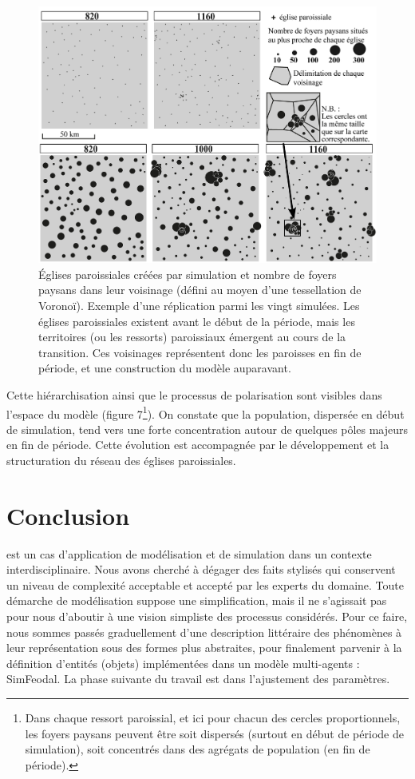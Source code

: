 \begin{figure}[!h]
	\centering
	\includegraphics[width=1\linewidth]{src/Chapitre_TMD/Fig7}
	\caption{Églises paroissiales créées par simulation et nombre de foyers paysans dans leur voisinage (défini au moyen d’une tessellation de Voronoï).
	Exemple d’une réplication parmi les vingt simulées.
	Les églises paroissiales existent avant le début de la période, mais les territoires (ou les ressorts) paroissiaux émergent au cours de la transition.
	Ces voisinages représentent donc les paroisses en fin de période, et une construction du modèle auparavant.}
	\label{fig:fig7}
\end{figure}

Cette hiérarchisation ainsi que le processus de polarisation sont visibles dans l'espace du modèle (figure 7\footnote{
Dans chaque ressort paroissial, et ici pour chacun des cercles proportionnels, les foyers paysans peuvent être soit dispersés (surtout en début de période de simulation), soit concentrés dans des agrégats de population (en fin de période).
}).
On constate que la population, dispersée en début de simulation, tend vers une forte concentration autour de quelques pôles majeurs en fin de période.
Cette évolution est accompagnée par le développement et la structuration du réseau des églises paroissiales.

\section*{Conclusion}

 est un cas d'application de modélisation et de simulation dans un contexte interdisciplinaire.
Nous avons cherché à dégager des faits stylisés qui conservent un niveau de complexité acceptable et accepté par les experts du domaine.
Toute démarche de modélisation suppose une simplification, mais il ne s'agissait pas pour nous d'aboutir à une vision simpliste des processus considérés.
Pour ce faire, nous sommes passés graduellement d'une description littéraire des phénomènes à leur représentation sous des formes plus abstraites, pour finalement parvenir à la définition d'entités (objets) implémentées dans un modèle multi-agents : SimFeodal.
La phase suivante du travail est dans l'ajustement des paramètres.

